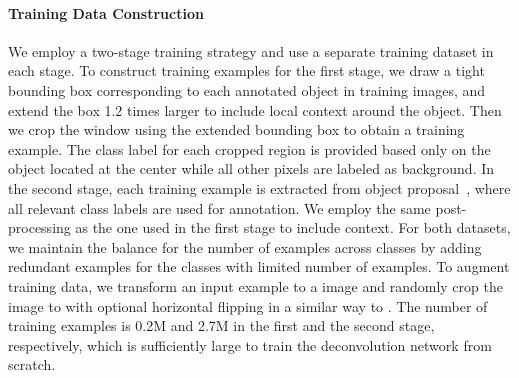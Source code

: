 \documentclass[10pt,twocolumn,letterpaper]{article}
\begin{document}
\paragraph{Training Data Construction}
We employ a two-stage training strategy and use a separate training dataset in each stage.
To construct training examples for the first stage, we draw a tight bounding box corresponding to each annotated object in training images, and extend the box 1.2 times larger to include local context around the object. 
Then we crop the window using the extended bounding box to obtain a training example.
The class label for each cropped region is provided based only on the object located at the center while all other pixels are labeled as background. 
In the second stage, each training example is extracted from object proposal~\cite{Edgebox}, where
all relevant class labels are used for annotation.
We employ the same post-processing as the one used in the first stage to include context.
For both datasets, we maintain the balance for the number of examples across classes by adding redundant examples for the classes with limited number of examples.
To augment training data, we transform an input example to a  image and randomly crop the image to  with optional horizontal flipping in a similar way to \cite{Vgg16}.
The number of training examples is 0.2M and 2.7M in the first and the second stage, respectively, which is sufficiently large to train the deconvolution network from scratch.


\iffalse
In second round training, we employ object proposals to construct training examples.
Specifically, candidate proposals significantly overlapped with ground truth segmentation (IOU  0.5) are set to positive examples. 
Then the same post-processing to first round training is applied to selected examples.
Using proposals to construct training data enforces more robustness to misaligned proposals during inference.
\fi


\iffalse
{\bf [Optimization] } \\
Optimization parameters: learning rate, SGD with momentum, weight decay, no drop-out, weight initialization (zero-mean gaussian), 
we follow the same way to optimize BN layers~\cite{}. 
\fi
\end{document}

